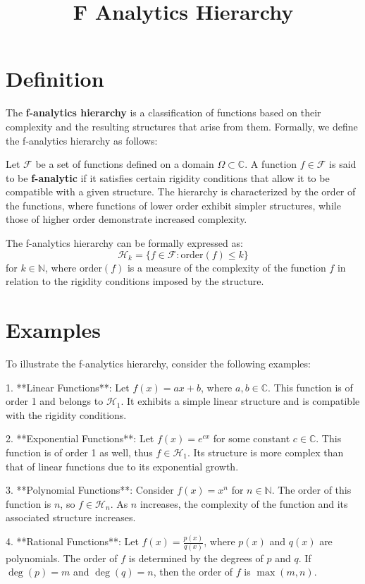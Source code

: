 \documentclass[11pt,a4paper]{article}
\title{F Analytics Hierarchy}
\date{}
\begin{document}
\maketitle
\section{Definition}
The \textbf{f-analytics hierarchy} is a classification of functions based on their complexity and the resulting structures that arise from them. Formally, we define the f-analytics hierarchy as follows:

Let $\mathcal{F}$ be a set of functions defined on a domain $\Omega \subset \mathbb{C}$. A function $f \in \mathcal{F}$ is said to be \textbf{f-analytic} if it satisfies certain rigidity conditions that allow it to be compatible with a given structure. The hierarchy is characterized by the order of the functions, where functions of lower order exhibit simpler structures, while those of higher order demonstrate increased complexity.

The f-analytics hierarchy can be formally expressed as:
$$
\mathcal{H}_k = \{ f \in \mathcal{F} : \text{order}(f) \leq k \}
$$
for $k \in \mathbb{N}$, where $\text{order}(f)$ is a measure of the complexity of the function $f$ in relation to the rigidity conditions imposed by the structure.

\section{Examples}
To illustrate the f-analytics hierarchy, consider the following examples:

1. **Linear Functions**: Let $f(x) = ax + b$, where $a, b \in \mathbb{C}$. This function is of order 1 and belongs to $\mathcal{H}_1$. It exhibits a simple linear structure and is compatible with the rigidity conditions.

2. **Exponential Functions**: Let $f(x) = e^{cx}$ for some constant $c \in \mathbb{C}$. This function is of order 1 as well, thus $f \in \mathcal{H}_1$. Its structure is more complex than that of linear functions due to its exponential growth.

3. **Polynomial Functions**: Consider $f(x) = x^n$ for $n \in \mathbb{N}$. The order of this function is $n$, so $f \in \mathcal{H}_n$. As $n$ increases, the complexity of the function and its associated structure increases.

4. **Rational Functions**: Let $f(x) = \frac{p(x)}{q(x)}$, where $p(x)$ and $q(x)$ are polynomials. The order of $f$ is determined by the degrees of $p$ and $q$. If $\deg(p) = m$ and $\deg(q) = n$, then the order of $f$ is $\max(m, n)$.
\end{document}
